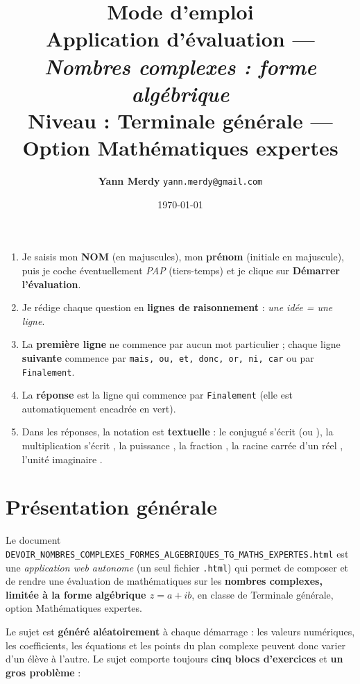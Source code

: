 \documentclass[11pt,a4paper]{article}
\title{\vspace{-1.2cm}\textbf{\color{bleufonce}Mode d'emploi}\\[2pt]
       \large Application d'évaluation — \emph{Nombres complexes : forme algébrique}\\
       \normalsize Niveau : Terminale générale — Option Mathématiques expertes}
\author{\textbf{Yann Merdy} \quad\texttt{\small yann.merdy@gmail.com}}
\date{\today}
\newcommand{\code}[1]{\texttt{\detokenize{#1}}}
\begin{document}
\maketitle
\thispagestyle{fancy}

\begin{retenir}
\begin{enumerate}
  \item Je saisis mon \textbf{NOM} (en majuscules), mon \textbf{prénom}
        (initiale en majuscule), puis je coche éventuellement \emph{PAP}
        (tiers-temps) et je clique sur \textbf{Démarrer l'évaluation}.
  \item Je rédige chaque question en \textbf{lignes de raisonnement} :
        \emph{une idée = une ligne}.
  \item La \textbf{première ligne} ne commence par aucun mot particulier ;
        chaque ligne \textbf{suivante} commence par
        \texttt{mais, ou, et, donc, or, ni, car} ou par \texttt{Finalement}.
  \item La \textbf{réponse} est la ligne qui commence par \texttt{Finalement}
        (elle est automatiquement encadrée en vert).
  \item Dans les réponses, la notation est \textbf{textuelle} :
        le conjugué s'écrit \code{bar(z)} (ou \code{bar(2+3i)}),
        la multiplication s'écrit \code{*}, la puissance \code{a^n},
        la fraction \code{/}, la racine carrée d'un réel \code{sqrt(a)},
        l'unité imaginaire \code{i}.
\end{enumerate}
\end{retenir}

\tableofcontents
\newpage

\section{Présentation générale}

Le document
\texttt{DEVOIR\_NOMBRES\_COMPLEXES\_FORMES\_ALGEBRIQUES\_TG\_MATHS\_EXPERTES.html}
est une \emph{application web autonome} (un seul fichier \texttt{.html}) qui
permet de composer et de rendre une évaluation de mathématiques sur les
\textbf{nombres complexes, limitée à la forme algébrique \(z = a + ib\)}, en
classe de Terminale générale, option Mathématiques expertes.

Le sujet est \textbf{généré aléatoirement} à chaque démarrage : les valeurs
numériques, les coefficients, les équations et les points du plan complexe
peuvent donc varier d'un élève à l'autre. Le sujet comporte toujours
\textbf{cinq blocs d'exercices} et \textbf{un gros problème} :
\end{document}
